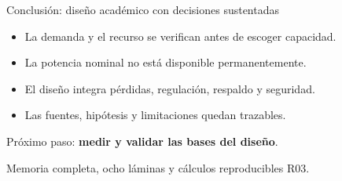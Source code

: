 \documentclass[aspectratio=169,14pt]{beamer}
\begin{document}
\begin{frame}{Conclusión: diseño académico con decisiones sustentadas}
\begin{itemize}
\item La demanda y el recurso se verifican antes de escoger capacidad.
\item La potencia nominal no está disponible permanentemente.
\item El diseño integra pérdidas, regulación, respaldo y seguridad.
\item Las fuentes, hipótesis y limitaciones quedan trazables.
\end{itemize}
\medskip\large Próximo paso: \textbf{medir y validar las bases del diseño}.\par
\small Memoria completa, ocho láminas y cálculos reproducibles R03.
\end{frame}
\end{document}
